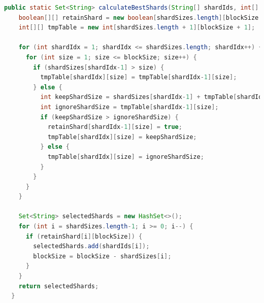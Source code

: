 \documentclass[11pt, a4paper, twoside]{report}
\begin{document}
\begin{lstlisting}[language=Java, caption=Knapsack Shard to Block Fitter, label=lst:shard2block]
  public static Set<String> calculateBestShards(String[] shardIds, int[] shardSizes, int blockSize) {
    boolean[][] retainShard = new boolean[shardSizes.length][blockSize + 1];
    int[][] tmpTable = new int[shardSizes.length + 1][blockSize + 1];

    for (int shardIdx = 1; shardIdx <= shardSizes.length; shardIdx++) {
      for (int size = 1; size <= blockSize; size++) {
        if (shardSizes[shardIdx-1] > size) {
          tmpTable[shardIdx][size] = tmpTable[shardIdx-1][size];
        } else {
          int keepShardSize = shardSizes[shardIdx-1] + tmpTable[shardIdx-1][size-shardSizes[shardIdx-1]];
          int ignoreShardSize = tmpTable[shardIdx-1][size];
          if (keepShardSize > ignoreShardSize) {
            retainShard[shardIdx-1][size] = true;
            tmpTable[shardIdx][size] = keepShardSize;
          } else {
            tmpTable[shardIdx][size] = ignoreShardSize;
          }
        }
      }
    }

    Set<String> selectedShards = new HashSet<>();
    for (int i = shardSizes.length-1; i >= 0; i--) {
      if (retainShard[i][blockSize]) {
        selectedShards.add(shardIds[i]);
        blockSize = blockSize - shardSizes[i];
      }
    }
    return selectedShards;
  }
\end{lstlisting}
\end{document}
